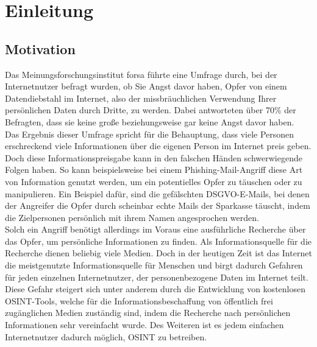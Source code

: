 \chapter{Einleitung}
\label{cha:einleitung}

\section{Motivation}
Das Meinungsforschungsinstitut forsa führte eine Umfrage durch, bei der Internetnutzer befragt wurden, ob Sie Angst davor haben, Opfer von einem Datendiebstahl im Internet, also der missbräuchlichen Verwendung Ihrer persönlichen Daten durch Dritte, zu werden. Dabei antworteten über 70\% der Befragten, dass sie keine große beziehungsweise gar keine Angst davor haben. \cite{AngstDatendiebstahl}\\
Das Ergebnis dieser Umfrage spricht für die Behauptung, dass viele Personen erschreckend viele Informationen über die eigenen Person im Internet preis geben. Doch diese Informationspreisgabe kann in den falschen Händen schwerwiegende Folgen haben. So kann beispielsweise bei einem Phishing-Mail-Angriff diese Art von Information genutzt werden, um ein potentielles Opfer zu täuschen oder zu manipulieren. 
Ein Beispiel dafür, sind die gefälschten DSGVO-E-Mails, bei denen der Angreifer die Opfer durch scheinbar echte Mails der Sparkasse täuscht, indem die Zielpersonen persönlich mit ihrem Namen angesprochen werden. \cite{VerbraucherzentraleNW}
\\
Solch ein Angriff benötigt allerdings im Voraus eine ausführliche Recherche über das Opfer, um persönliche Informationen zu finden. Als Informationsquelle für die Recherche dienen beliebig viele Medien. Doch in der heutigen Zeit ist das Internet die meistgenutzte Informationsquelle für Menschen und birgt dadurch Gefahren für jeden einzelnen Internetnutzer, der personenbezogene Daten im Internet teilt. \cite{Inforamtionsquellen} Diese Gefahr steigert sich unter anderem durch die Entwicklung von kostenlosen OSINT-Tools, welche für die Informationsbeschaffung von öffentlich frei zugänglichen Medien zuständig sind, indem die Recherche nach persönlichen Informationen sehr vereinfacht wurde. Des Weiteren ist es jedem einfachen Internetnutzer dadurch möglich, OSINT zu betreiben.


